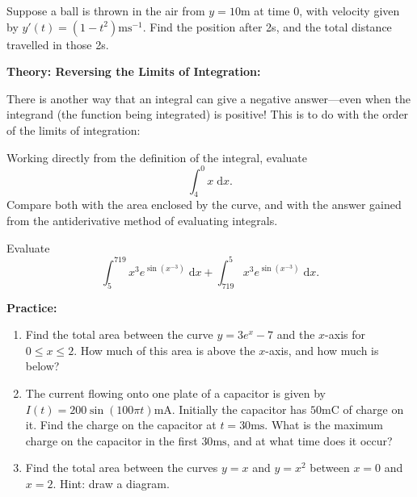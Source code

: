 \documentclass{article}
\newcommand{\diff}{\;\mathrm{d}}
\begin{document}
Suppose a ball is thrown in the air from $y=10\mathrm{m}$ at time $0$, with velocity given by $y'(t)=(1-t^2)\mathrm{ms^{-1}}$. Find the position after 2s, and the total distance travelled in those 2s.

\clearpage


\textbf{Theory: Reversing the Limits of Integration:}\bigskip


There is another way that an integral can give a negative answer---even when the integrand (the function being integrated) is positive! This is to do with the order of the limits of integration:\medskip

Working directly from the definition of the integral, evaluate
\[\int_4^0 x\diff x.\]
Compare both with the area enclosed by the curve, and with the answer gained from the antiderivative method of evaluating integrals.


\vfill


Evaluate
\[\int_5^{719} x^3e^{\sin\left(x^{-3}\right)}\diff x + \int_{719}^5  x^3e^{\sin\left(x^{-3}\right)}\diff x.\]

\vfill


\clearpage


















\textbf{Practice:}\bigskip





\begin{enumerate}
	\item Find the total area between the curve $y=3e^x-7$ and the $x$-axis for $0\leq x\leq 2$. How much of this area is above the $x$-axis, and how much is below?
	\item The current flowing onto one plate of a capacitor is given by $I(t)=200\sin(100\pi t)\mathrm{mA}$. Initially the capacitor has $50\mathrm{mC}$ of charge on it. Find the charge on the capacitor at $t=30\mathrm{ms}$. What is the maximum charge on the capacitor in the first $30\mathrm{ms}$, and at what time does it occur?
	\item Find the total area between the curves $y=x$ and $y=x^2$ between $x=0$ and $x=2$. Hint: draw a diagram.
\end{enumerate}
\end{document}
